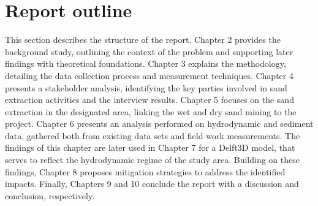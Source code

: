\section{Report outline}
\label{section: report outline}
This section describes the structure of the report. Chapter 2 provides the background study, outlining the context of the problem and supporting later findings with theoretical foundations. Chapter 3 explains the methodology, detailing the data collection process and measurement techniques. Chapter 4 presents a stakeholder analysis, identifying the key parties involved in sand extraction activities and the interview results. Chapter 5 focuses on the sand extraction in the designated area, linking the wet and dry sand mining to the project. Chapter 6 presents an analysis performed on hydrodynamic and sediment data, gathered both from existing data sets and field work measurements. The findings of this chapter are later used in Chapter 7 for a Delft3D model, that serves to reflect the hydrodynamic regime of the study area. Building on these findings, Chapter 8 proposes mitigation strategies to address the identified impacts. Finally, Chapters 9 and 10 conclude the report with a discussion and conclusion, respectively.
